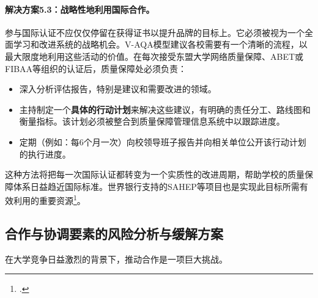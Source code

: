 \paragraph{解决方案5.3：战略性地利用国际合作。}
参与国际认证不应仅仅停留在获得证书以提升品牌的目标上。它必须被视为一个全面学习和改进系统的战略机会。V-AQA模型建议各校需要有一个清晰的流程，以最大限度地利用这些活动的价值。在每次接受东盟大学网络质量保障、ABET或FIBAA等组织的认证后，质量保障处必须负责：
\begin{itemize}
    \item 深入分析评估报告，特别是建议和需要改进的领域。
    \item 主持制定一个\textbf{具体的行动计划}来解决这些建议，有明确的责任分工、路线图和衡量指标。该计划必须被整合到质量保障管理信息系统中以跟踪进度。
    \item 定期（例如：每6个月一次）向校领导班子报告并向相关单位公开该行动计划的执行进度。
\end{itemize}
这种方法将把每一次国际认证都转变为一个实质性的改进周期，帮助学校的质量保障体系日益趋近国际标准。世界银行支持的SAHEP等项目也是实现此目标所需有效利用的重要资源\footcite{worldbank_sahep}。

\subsection{合作与协调要素的风险分析与缓解方案}
\label{subsec:risk_hoptac}
在大学竞争日益激烈的背景下，推动合作是一项巨大挑战。

